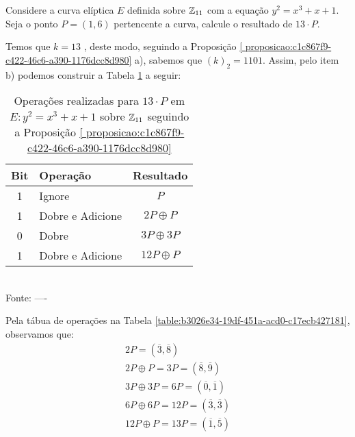 \begin{exemplo} \label{exemplo:8b11e78d-bb21-4075-81cf-4baf05b73e59}

	Considere a curva elíptica $E$ definida sobre $\mathbb{Z}_{11}$ com a equação $y^2 =
		x^3 + x + 1$. Seja o ponto $P = (1,6)$ pertencente a curva, calcule o resultado
	de $13 \cdot P$.

	Temos que $k = 13$ , deste modo, seguindo a Proposição \ref{
		proposicao:c1c867f9-c422-46c6-a390-1176dcc8d980} a), sabemos que $(k)_2 =
		1101$. Assim, pelo item b) podemos construir a Tabela
	\ref{table:36b58d42-e659-4ced-895d-ad67884a3797} a seguir:

	\begin{table}[h!]\centering
		\caption{Operações realizadas para $13 \cdot P$ em  $E: y^2 = x^3
				+ x + 1$  sobre $\mathbb{Z}_{11}$ seguindo a Proposição \ref{ proposicao:c1c867f9-c422-46c6-a390-1176dcc8d980}} \label{table:36b58d42-e659-4ced-895d-ad67884a3797}
		\begin{tabular}{|c|l|c|}
			\hline
			\textbf{Bit} & \textbf{Operação} & \textbf{Resultado} \\
			\hline
			1            & Ignore            & $P$                \\
			\hline
			1            & Dobre e Adicione  & $ 2P \oplus P$     \\
			\hline
			0            & Dobre             & $3P  \oplus3 P$    \\
			\hline
			1            & Dobre e Adicione  & $12P  \oplus P$    \\
			\hline
		\end{tabular}
		\vspace*{0.4cm}\\ %
		Fonte:  ----
	\end{table}

	\justify Pela tábua de operações na Tabela \ref{table:b3026e34-19df-451a-acd0-c17ecb427181}, observamos que:
	\begin{align}
		2P = (\overline{3},\overline{8})   \nonumber                  \\
		2P \oplus  P = 3 P = (\overline{8},\overline{9})  \nonumber   \\
		3P \oplus 3P = 6P = (\overline{0},\overline{1})   \nonumber   \\
		6P \oplus 6P = 	12P = (\overline{3},\overline{3})   \nonumber \\
		12P \oplus P = 13P = (\overline{1},\overline{5})   \nonumber
	\end{align}


\end{exemplo}
